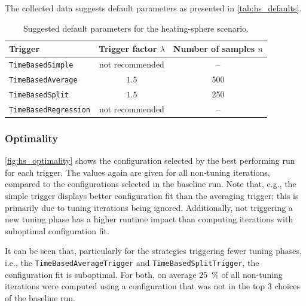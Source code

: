 The collected data suggests default parameters as presented in \autoref{tab:hs_defaults}.
\begin{table}[htpb]
	\centering
	\begin{tabular}{lcc}
		\toprule
		\textbf{Trigger}             & \textbf{Trigger factor $\lambda$} & \textbf{Number of samples $n$} \\ [0em]
		\midrule
		\texttt{TimeBasedSimple}     & not recommended                   & --                             \\
		\texttt{TimeBasedAverage}    & $1.5$                             & 500                            \\
		\texttt{TimeBasedSplit}      & $1.5$                             & 250                            \\
		\texttt{TimeBasedRegression} & not recommended                   & --                             \\
		\bottomrule
	\end{tabular}
	\caption{Suggested default parameters for the heating-sphere scenario.}
	\label{tab:hs_defaults}
\end{table}



\subsubsection{Optimality}
\autoref{fig:hs_optimality} shows the configuration selected by the best performing run for each trigger. The values again are given for all non-tuning iterations, compared to the configurations selected in the baseline run. Note that, e.g., the simple trigger displays better configuration fit than the averaging trigger; this is primarily due to tuning iterations being ignored. Additionally, not triggering a new tuning phase has a higher runtime impact than computing iterations with suboptimal configuration fit.

It can be seen that, particularly for the strategies triggering fewer tuning phases, i.e., the \texttt{TimeBasedAverageTrigger} and \texttt{TimeBasedSplitTrigger}, the configuration fit is suboptimal. For both, on average \qty{25}{\percent} of all non-tuning iterations were computed using a configuration that was not in the top 3 choices of the baseline run.



